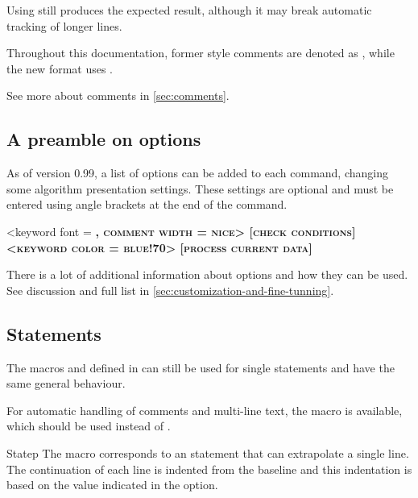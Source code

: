 \documentclass[a4paper, 11pt]{article}
\begin{document}
Using  still produces the expected result, although it may break automatic tracking of longer lines.

Throughout this documentation, former style comments are denoted as , while the new format uses .

See more about comments in \cref{sec:comments}.

\subsection{A preamble on options}\label{sec:a-preamble-on-options}
%
As of version 0.99, a list of options can be added to each command, changing some algorithm presentation settings. These settings are optional and must be entered using angle brackets at the end of the command.

\begin{PDExample}
    \begin{algorithmic}
        <keyword font = \scshape\bfseries, comment width = nice>
        [check conditions]
                <keyword color = blue!70>
                [process current data]
            \EndWhile
        \EndIf
    \end{algorithmic}
\end{PDExample}

There is a lot of additional information about options and how they can be used. See discussion and full list in \cref{sec:customization-and-fine-tunning}.

\subsection{Statements}\label{sec:statements}

The macros  and  defined in  can still be used for single statements and have the same general behaviour.

For automatic handling of comments and multi-line text, the  macro is available, which should be used instead of .

\begin{Macrodef}{Statep}{}{}
    The  macro corresponds to an statement that can extrapolate a single line. The continuation of each line is indented from the baseline and this indentation is based on the value indicated in the  option.

    \MacroOptionsText
\end{Macrodef}
\end{document}
